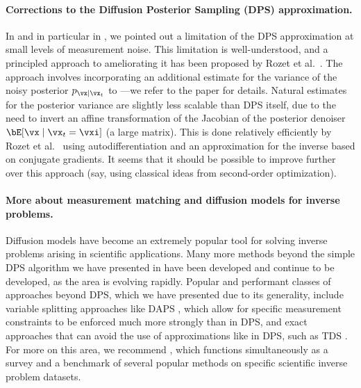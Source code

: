 \documentclass[../../book-main.tex]{subfiles}
\begin{document}
\paragraph{Corrections to the Diffusion Posterior Sampling (DPS) approximation.}
In  and in particular in
, we pointed out
a limitation of the DPS approximation
 at
small levels of measurement noise. 
This limitation is well-understood, and a principled approach to ameliorating it
has been proposed by Rozet et al.\ \cite{rozet2024learning}.
The approach involves incorporating an additional estimate for the variance of
the noisy posterior $p_{\vx \mid \vx_t}$ to
---we
refer to the paper for details.
Natural estimates for the posterior variance are slightly less scalable than DPS
itself, due to the need to invert an affine transformation of the Jacobian of
the posterior denoiser $\bE[\vx \mid \vx_t=\vxi]$ (a large matrix). This is done
relatively efficiently by Rozet et al.\ \cite{rozet2024learning} using autodifferentiation and an
approximation for the inverse based on conjugate gradients. It seems that it
should be possible to improve further over this approach (say, using classical
ideas from second-order optimization).


\paragraph{More about measurement matching and diffusion models for inverse
problems.} 

Diffusion models have become an extremely popular tool for solving inverse
problems arising in scientific applications. Many more methods beyond the simple
DPS algorithm we have presented in  have been
developed and continue to be developed, as the area is evolving rapidly.
Popular and performant classes of approaches beyond DPS, which we have presented
due to its generality, include variable splitting approaches like DAPS
\cite{Zhang2024-ha},
which allow for specific measurement constraints to be enforced much more
strongly than in DPS, and exact approaches that can avoid the use of
approximations like in DPS, such as TDS \cite{wu2023practical}.
For more on this area, we recommend \cite{zheng2025inversebench}, which
functions simultaneously as a survey and a benchmark of several popular methods
on specific scientific inverse problem datasets.
\end{document}
